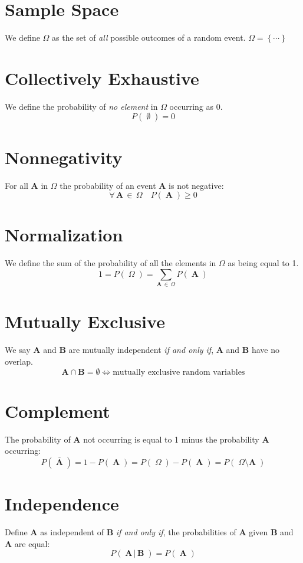 \documentclass{article}
\newcommand{\Parens}[1]{\ensuremath{\left(\;#1\;\right)}\xspace}
\newcommand{\Prob}[1]{\ensuremath{\mathit{P}\Parens{#1}}\xspace}
\newcommand{\ProbGiven}[2]{\ensuremath{\mathit{P}\Parens{#1\,|\,#2}}\xspace}
\newcommand{\RandVar}[1]{\ensuremath{\mathbf{#1}}\xspace}
\begin{document}
\section*{Sample Space}
We define $\Omega$ as the set of \emph{all} possible outcomes of a random event. $\Omega = \left\{ \cdots \right\}$

\section*{Collectively Exhaustive}
We define the probability of \emph{no element} in $\Omega$ occurring as $0$. 
$$\Prob{\emptyset} = 0$$

\section*{Nonnegativity}
For all $\RandVar{A}$ in $\Omega$ the probability of an event \RandVar{A} is not negative:
$$\forall\,\RandVar{A}\,\in\,\Omega\quad\Prob{\RandVar{A}} \ge 0$$

\section*{Normalization}
We define the sum of the probability of all the elements in $\Omega$ as being equal to 1.
\[
1 = \Prob{\Omega} = \sum\limits_{\RandVar{A}\,\in\,\Omega} \Prob{\RandVar{A}}
\]

\section*{Mutually Exclusive}
We say \RandVar{A} and \RandVar{B} are mutually independent \emph{if and only if},  \RandVar{A} and \RandVar{B} have no overlap.
$$\RandVar{A} \cap \RandVar{B} = \emptyset \iff \text{mutually exclusive random variables}$$

\section*{Complement}
The probability of \RandVar{A} not occurring is equal to 1 minus the probability \RandVar{A} occurring:
\[
\Prob{\overline{\RandVar{A}}} = 1 - \Prob{\RandVar{A}} = \Prob{\Omega} - \Prob{\RandVar{A}} = \Prob{\Omega \setminus \RandVar{A}}
\]


\section*{Independence}
Define \RandVar{A} as independent of \RandVar{B} \emph{if and only if}, the probabilities of \RandVar{A} given \RandVar{B} and \RandVar{A} are equal:
$$\ProbGiven{\RandVar{A}}{\RandVar{B}} = \Prob{\RandVar{A}}$$
\end{document}
